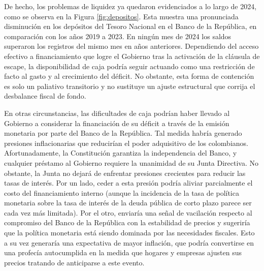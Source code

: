 

De hecho, los problemas de liquidez ya quedaron evidenciados a lo largo de 2024, como se observa en la Figura \ref{fig:depositos}. Esta muestra una pronunciada disminución en los depósitos del Tesoro Nacional en el Banco de la República, en comparación con los años 2019 a 2023. En ningún mes de 2024 los saldos superaron los registros del mismo mes en años anteriores. Dependiendo del acceso efectivo a financiamiento que logre el Gobierno tras la activación de la cláusula de escape, la disponibilidad de caja podría seguir actuando como una restricción de facto al gasto y al crecimiento del déficit. No obstante, esta forma de contención es solo un paliativo transitorio y no sustituye un ajuste estructural que corrija el desbalance fiscal de fondo.

En otras circunstancias, las dificultades de caja podrían haber llevado al Gobierno a considerar la financiación de su déficit a través de la emisión monetaria por parte del Banco de la República. Tal medida habría generado presiones inflacionarias que reducirían el poder adquisitivo de los colombianos. Afortunadamente, la Constitución garantiza la independencia del Banco, y cualquier préstamo al Gobierno requiere la unanimidad de su Junta Directiva. No obstante, la Junta no dejará de enfrentar presiones crecientes para reducir las tasas de interés. Por un lado, ceder a esta presión podría aliviar parcialmente el costo del financiamiento interno (aunque la incidencia de la tasa de política monetaria sobre la tasa de interés de la deuda pública de corto plazo parece ser cada vez más limitada). Por el otro, enviaría una señal de vacilación respecto al compromiso del Banco de la República con la estabilidad de precios y sugeriría que la política monetaria está siendo dominada por las necesidades fiscales. Esto a su vez generaría una expectativa de mayor inflación, que podría convertirse en una profecía autocumplida en la medida que hogares y empresas ajusten sus precios tratando de anticiparse a este evento.

